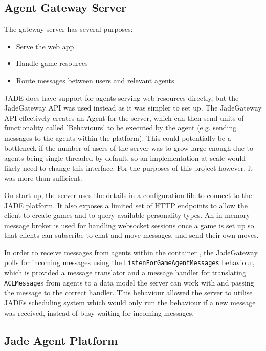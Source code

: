 \documentclass{article}
\begin{document}
\subsection{Agent Gateway Server}

The gateway server has several purposes: 
\begin{itemize}
	\item{Serve the web app}
	\item{Handle game resources}
	\item{Route messages between users and relevant agents}
\end{itemize}

JADE does have support for agents serving web resources directly, but the JadeGateway API was used instead as it was simpler to set up. The JadeGateway API effectively creates an Agent for the server, which can then send units of functionality called 'Behaviours' to be executed by the agent (e.g. sending messages to the agents within the platform). This could potentially be a bottleneck if the number of users of the server was to grow large enough due to agents being single-threaded by default, so an implementation at scale would likely need to change this interface. For the purposes of this project however, it was more than sufficient.

On start-up, the server uses the details in a configuration file to connect to the JADE platform. It also exposes a limited set of HTTP endpoints to allow the client to create games and to query available personality types. An in-memory message broker is used for handling websocket sessions once a game is set up so that clients can subscribe to chat and move messages, and send their own moves. 

In order to receive messages from agents within the container , the JadeGateway polls for incoming messages using the \lstinline{ListenForGameAgentMessages} behaviour, which is provided a message translator and a message handler for translating \lstinline{ACLMessage}s from agents to a data model the server can work with and passing the message to the correct handler. This behaviour allowed the server to utilise JADEs scheduling system which would only run the behaviour if a new message was received, instead of busy waiting for incoming messages. 

\subsection{Jade Agent Platform}
\end{document}
